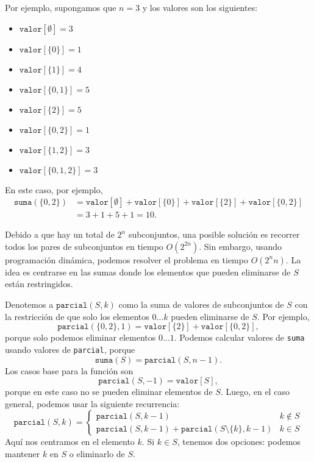 Por ejemplo, supongamos que $n=3$ y los valores son los siguientes:
\begin{multicols}{2}
    \begin{itemize}
        \item $\texttt{valor}[\emptyset] = 3$
        \item $\texttt{valor}[\{0\}] = 1$
        \item $\texttt{valor}[\{1\}] = 4$
        \item $\texttt{valor}[\{0,1\}] = 5$
        \item $\texttt{valor}[\{2\}] = 5$
        \item $\texttt{valor}[\{0,2\}] = 1$
        \item $\texttt{valor}[\{1,2\}] = 3$
        \item $\texttt{valor}[\{0,1,2\}] = 3$
    \end{itemize}
\end{multicols}
En este caso, por ejemplo,
\begin{equation*}
    \begin{split}
        \texttt{suma}(\{0,2\}) &= \texttt{valor}[\emptyset]+\texttt{valor}[\{0\}]+\texttt{valor}[\{2\}]+\texttt{valor}[\{0,2\}] \\
        &= 3 + 1 + 5 + 1 = 10.
    \end{split}
\end{equation*}

Debido a que hay un total de $2^n$ subconjuntos,
una posible solución es recorrer todos
los pares de subconjuntos en tiempo $O(2^{2n})$.
Sin embargo, usando programación dinámica, podemos
resolver el problema en tiempo $O(2^n n)$.
La idea es centrarse en las sumas donde los
elementos que pueden eliminarse de $S$ están restringidos.

Denotemos a $\texttt{parcial}(S,k)$ como la suma de
valores de subconjuntos de $S$ con la restricción
de que solo los elementos $0 \ldots k$
pueden eliminarse de $S$.
Por ejemplo,
\[\texttt{parcial}(\{0,2\},1)=\texttt{valor}[\{2\}]+\texttt{valor}[\{0,2\}],\]
porque solo podemos eliminar elementos $0 \ldots 1$.
Podemos calcular valores de \texttt{suma} usando
valores de \texttt{parcial}, porque
\[\texttt{suma}(S) = \texttt{parcial}(S,n-1).\]
Los casos base para la función son
\[\texttt{parcial}(S,-1)=\texttt{valor}[S],\]
porque en este caso no se pueden eliminar elementos de $S$.
Luego, en el caso general, podemos usar la siguiente recurrencia:
\begin{equation*}
    \texttt{parcial}(S,k) = \begin{cases}
        \texttt{parcial}(S,k-1)                                           & k \notin S \\
        \texttt{parcial}(S,k-1) + \texttt{parcial}(S \setminus \{k\},k-1) & k \in S
    \end{cases}
\end{equation*}
Aquí nos centramos en el elemento $k$.
Si $k \in S$, tenemos dos opciones: podemos mantener $k$ en $S$
o eliminarlo de $S$.

